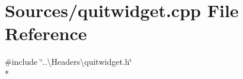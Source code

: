 \section{Sources/quitwidget.cpp File Reference}
\label{quitwidget_8cpp}
{\ttfamily \#include \char`\"{}..\textbackslash{}\+Headers\textbackslash{}quitwidget.\+h\char`\"{}}\\*
